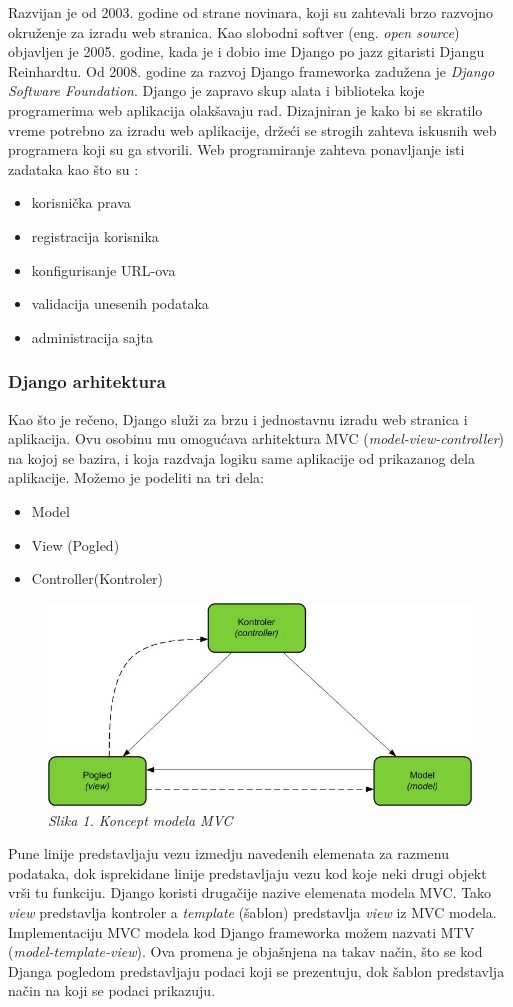 \documentclass[12pt]{article}
\begin{document}
Razvijan je od 2003. godine od strane novinara, koji su zahtevali brzo razvojno okruženje za izradu web stranica. Kao slobodni softver (eng. \textsl{open source}) objavljen je 2005. godine, kada je i dobio ime Django po jazz gitaristi Djangu Reinhardtu. Od 2008. godine za razvoj Django frameworka zadužena je \textsl{Django Software Foundation}.
Django je zapravo skup alata i biblioteka koje programerima web aplikacija olakšavaju rad. Dizajniran je kako bi se skratilo vreme potrebno za izradu web aplikacije, držeći se strogih zahteva iskusnih web programera koji su ga stvorili. Web programiranje zahteva ponavljanje isti zadataka kao što su :
\begin{itemize}
\item korisnička prava
\item registracija korisnika
\item konfigurisanje URL-ova
\item validacija unesenih podataka
\item administracija sajta
\end{itemize}
 
\subsubsection{Django arhitektura}
Kao što je rečeno, Django služi za brzu i jednostavnu izradu web stranica i aplikacija. Ovu osobinu mu omogućava arhitektura MVC (\textsl{model-view-controller}) na kojoj se bazira, i koja razdvaja logiku same aplikacije od prikazanog dela aplikacije. Možemo je podeliti na tri dela:
\begin{itemize}
\item Model 
\item View (Pogled)
\item Controller(Kontroler)
\end{itemize}
\begin{figure}[h!]
\centering
\includegraphics[width=0.6\linewidth]{django.jpeg}
\caption*{\textsl{Slika 1. Koncept modela MVC }}
\end{figure}
Pune linije predstavljaju vezu izmedju navedenih elemenata za razmenu podataka, dok isprekidane linije predstavljaju vezu kod koje neki drugi objekt vrši tu funkciju. Django koristi drugačije nazive elemenata modela MVC. Tako \textsl{view} predstavlja kontroler a \textsl{template} (šablon) predstavlja \textsl{view} iz MVC modela. Implementaciju MVC modela kod Django frameworka možem nazvati MTV (\textsl{model-template-view}). Ova promena je objašnjena na takav način, što se kod Djanga pogledom predstavljaju podaci koji se prezentuju, dok šablon predstavlja način na koji se podaci prikazuju. 
\end{document}

